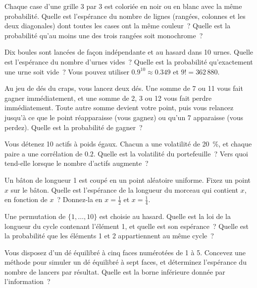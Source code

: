 \begin{question}\label{iq:iv1:timed-test-6:6}
Chaque case d'une grille 3 par 3 est coloriée en noir ou en blanc avec la même probabilité. Quelle est l'espérance du nombre de lignes (rangées, colonnes et les deux diagonales) dont toutes les cases ont la même couleur~? Quelle est la probabilité qu'au moins une des trois rangées soit monochrome~?
\end{question}


\begin{question}\label{iq:iv1:timed-test-6:7}
Dix boules sont lancées de façon indépendante et au hasard dans 10 urnes. Quelle est l'espérance du nombre d'urnes vides~? Quelle est la probabilité qu'exactement une urne soit vide~? Vous pouvez utiliser $0.9^{10} \approx 0.349$ et $9! = 362\,880$.
\end{question}

\begin{question}\label{iq:iv1:timed-test-6:8}
Au jeu de dés du craps, vous lancez deux dés. Une somme de 7 ou 11 vous fait gagner immédiatement, et une somme de 2, 3 ou 12 vous fait perdre immédiatement. Toute autre somme devient votre point, puis vous relancez jusqu'à ce que le point réapparaisse (vous gagnez) ou qu'un 7 apparaisse (vous perdez). Quelle est la probabilité de gagner~?
\end{question}

\begin{question}\label{iq:iv1:timed-test-6:9}
Vous détenez 10 actifs à poids égaux. Chacun a une volatilité de 20~\%, et chaque paire a une corrélation de $0.2$. Quelle est la volatilité du portefeuille~? Vers quoi tend-elle lorsque le nombre d'actifs augmente~?
\end{question}

\begin{question}\label{iq:iv1:timed-test-6:10}
Un bâton de longueur 1 est coupé en un point aléatoire uniforme. Fixez un point $x$ sur le bâton. Quelle est l'espérance de la longueur du morceau qui contient $x$, en fonction de $x$~? Donnez-la en $x = \frac12$ et $x = \frac14$.
\end{question}

\begin{question}\label{iq:iv1:timed-test-6:11}
Une permutation de $\{1, \dots, 10\}$ est choisie au hasard. Quelle est la loi de la longueur du cycle contenant l'élément 1, et quelle est son espérance~? Quelle est la probabilité que les éléments 1 et 2 appartiennent au même cycle~?
\end{question}

\begin{question}\label{iq:iv1:timed-test-6:12}
Vous disposez d'un dé équilibré à cinq faces numérotées de 1 à 5. Concevez une méthode pour simuler un dé équilibré à sept faces, et déterminez l'espérance du nombre de lancers par résultat. Quelle est la borne inférieure donnée par l'information~?
\end{question}
